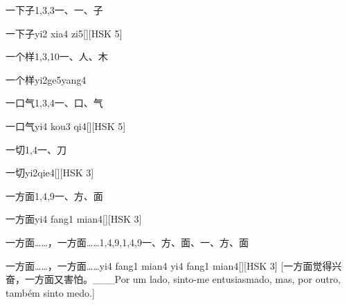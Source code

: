 \begin{entry}{一下子}{1,3,3}{⼀、⼀、⼦}
  \begin{phonetics}{一下子}{yi2 xia4 zi5}[][HSK 5]
  \end{phonetics}
\end{entry}

\begin{entry}{一个样}{1,3,10}{⼀、⼈、⽊}
  \begin{phonetics}{一个样}{yi2ge5yang4}
  \end{phonetics}
\end{entry}

\begin{entry}{一口气}{1,3,4}{⼀、⼝、⽓}
  \begin{phonetics}{一口气}{yi4 kou3 qi4}[][HSK 5]
  \end{phonetics}
\end{entry}

\begin{entry}{一切}{1,4}{⼀、⼑}
  \begin{phonetics}{一切}{yi2qie4}[][HSK 3]
  \end{phonetics}
\end{entry}

\begin{entry}{一方面}{1,4,9}{⼀、⽅、⾯}
  \begin{phonetics}{一方面}{yi4 fang1 mian4}[][HSK 3]
  \end{phonetics}
\end{entry}

\begin{entry}{一方面……，一方面……}{1,4,9,1,4,9}{⼀、⽅、⾯、⼀、⽅、⾯}
  \begin{phonetics}{一方面……，一方面……}{yi4 fang1 mian4 yi4 fang1 mian4}[][HSK 3]
    [一方面觉得兴奋，一方面又害怕。___Por um lado, sinto-me entusiasmado, mas, por outro, também sinto medo.]
  \end{phonetics}
\end{entry}

